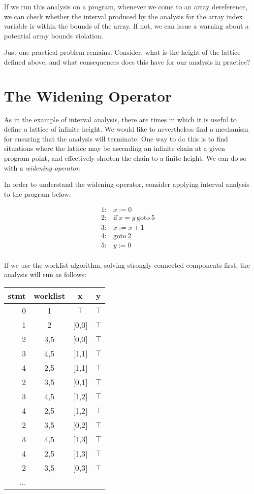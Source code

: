 \documentclass[11pt]{article}
\def\tablespace{\vspace{2ex}}
\begin{document}
\begin{sloppypar}
If we run this analysis on a program, whenever we come to an array dereference, we can check whether the interval produced by the analysis for the array index variable is within the bounds of the array.  If not, we can issue a warning about a potential array bounds violation.

Just one practical problem remains.  Consider, what is the height of the lattice defined above, and what consequences does this have for our analysis in practice?


\section{The Widening Operator}

As in the example of interval analysis, there are times in which it is useful to define a lattice of infinite height.  We would like to nevertheless find a mechanism for ensuring that the analysis will terminate.  One way to do this is to find situations where the lattice may be ascending an infinite chain at a given program point, and effectively shorten the chain to a finite height.  We can do so with a \textit{widening operator}.

In order to understand the widening operator, consider applying interval analysis to the program below:

\[
\begin{array}{ll}
1: & x := 0\\
2: & \mbox{if}~x=y~\mbox{goto}~5\\
3: & x := x + 1\\
4: & \mbox{goto}~2\\
5: & y := 0\\
\end{array}
\]

If we use the worklist algorithm, solving strongly connected components first, the analysis will run as follows:

\tablespace
\begin{tabular}{r | c | c c}

stmt & worklist & x & y \\
\hline
0  & 1   & $\top$ & $\top$ \\
1  & 2   & [0,0] & $\top$ \\
2  & 3,5 & [0,0] & $\top$ \\
3  & 4,5 & [1,1] & $\top$ \\
4  & 2,5 & [1,1] & $\top$ \\
2  & 3,5 & [0,1] & $\top$ \\
3  & 4,5 & [1,2] & $\top$ \\
4  & 2,5 & [1,2] & $\top$ \\
2  & 3,5 & [0,2] & $\top$ \\
3  & 4,5 & [1,3] & $\top$ \\
4  & 2,5 & [1,3] & $\top$ \\
2  & 3,5 & [0,3] & $\top$ \\
...
\end{tabular}
\tablespace


\end{sloppypar}
\end{document}

